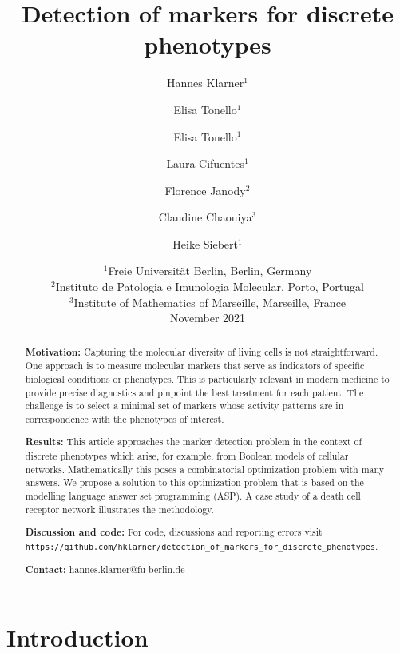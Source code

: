 \documentclass[11pt]{article}
\begin{document}
    \title{Detection of markers for discrete phenotypes}
    \author{Hannes Klarner$^1$ \and Elisa Tonello$^1$ \and Elisa Tonello$^1$ \and Laura Cifuentes$^1$ \and Florence Janody$^2$ \and Claudine Chaouiya$^3$ \and Heike Siebert$^1$}
    \date{%
        $^1$Freie Universität Berlin, Berlin, Germany\\%
        $^2$Instituto de Patologia e Imunologia Molecular, Porto, Portugal\\%
        $^3$Institute of Mathematics of Marseille, Marseille, France\\[2ex]%
        November 2021
    }
    \maketitle

    \begin{abstract}
        \textbf{Motivation:}
        Capturing the molecular diversity of living cells is not straightforward.
        One approach is to measure molecular markers that serve as indicators of specific biological conditions or phenotypes.
        This is particularly relevant in modern medicine to provide precise diagnostics and pinpoint the best treatment for each patient.
        The challenge is to select a minimal set of markers whose activity patterns are in correspondence with the phenotypes of interest.

        \textbf{Results:}
        This article approaches the marker detection problem in the context of discrete phenotypes which arise, for example, from Boolean models of cellular networks.
        Mathematically this poses a combinatorial optimization problem with many answers.
        We propose a solution to this optimization problem that is based on the modelling language answer set programming (ASP).
        A case study of a death cell receptor network illustrates the methodology.

        \textbf{Discussion and code:}
        For code, discussions and reporting errors visit \verb+https://github.com/hklarner/detection_of_markers_for_discrete_phenotypes+.

        \textbf{Contact:}
        hannes.klarner@fu-berlin.de
    \end{abstract}

    \section{Introduction}
\end{document}
